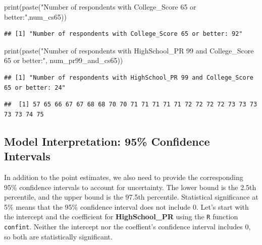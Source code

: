 \documentclass[
]{article}
\newenvironment{Shaded}{\begin{snugshade}}{\end{snugshade}}
\newcommand{\DecValTok}[1]{\textcolor[rgb]{0.00,0.00,0.81}{#1}}
\newcommand{\FunctionTok}[1]{\textcolor[rgb]{0.00,0.00,0.00}{#1}}
\newcommand{\NormalTok}[1]{#1}
\newcommand{\SpecialCharTok}[1]{\textcolor[rgb]{0.00,0.00,0.00}{#1}}
\newcommand{\StringTok}[1]{\textcolor[rgb]{0.31,0.60,0.02}{#1}}
\begin{document}
\begin{Shaded}
\begin{Highlighting}[]
\FunctionTok{print}\NormalTok{(}\FunctionTok{paste}\NormalTok{(}\StringTok{"Number of respondents with College\_Score 65 or better:"}\NormalTok{,num\_cs65))}
\end{Highlighting}
\end{Shaded}

\begin{verbatim}
## [1] "Number of respondents with College_Score 65 or better: 92"
\end{verbatim}

\begin{Shaded}
\begin{Highlighting}[]
\FunctionTok{print}\NormalTok{(}\FunctionTok{paste}\NormalTok{(}\StringTok{"Number of respondents with HighSchool\_PR 99 and College\_Score 65 or better:"}\NormalTok{,}
\NormalTok{            num\_pr99\_and\_cs65))}
\end{Highlighting}
\end{Shaded}

\begin{verbatim}
## [1] "Number of respondents with HighSchool_PR 99 and College_Score 65 or better: 24"
\end{verbatim}

\begin{Shaded}
\end{Shaded}

\begin{verbatim}
##  [1] 57 65 66 67 67 68 68 70 70 71 71 71 71 71 72 72 72 72 73 73 73 73 73 74 75
\end{verbatim}

\hypertarget{logit-results}{%
\subsection{Model Interpretation: 95\% Confidence
Intervals}\label{logit-results}}

In addition to the point estimates, we also need to provide the
corresponding 95\% confidence intervals to account for uncertainty. The
lower bound is the 2.5th percentile, and the upper bound is the 97.5th
percentile. Statistical significance at 5\% means that the 95\%
confidence interval does not include 0. Let's start with the intercept
and the coefficient for \textbf{HighSchool\_PR} using the \texttt{R}
function \texttt{confint}. Neither the intercept nor the coeffient's
confidence interval includes 0, so both are statistically significant.
\end{document}
